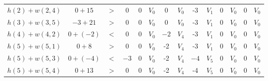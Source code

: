 \documentclass[../tp2_grupo404.tex]{subfiles}
\begin{document}
\begin{table}[H]
\begin{tabular}{@{}cccccccccccccc@{}}
    $h(2)+w(2,4)$ & $0+15$                          & $>$                        & 0                           & 0 & $V_0$ & 0                           & $V_0$                        & -3                          & $V_1$                               & 0 & $V_0$ & 0 & $V_0$ \\
    $h(3)+w(3,5)$ & $-3+21$                         & $>$                        & 0                           & 0 & $V_0$ & 0                           & $V_0$                        & -3                          & $V_1$                               & 0 & $V_0$ & 0 & $V_0$ \\
    $h(4)+w(4,2)$ & {\color[HTML]{9A0000} $0+(-2)$} & {\color[HTML]{9A0000} $<$} & {\color[HTML]{9A0000} $0$}  & 0 & $V_0$ & {\color[HTML]{9A0000} $-2$} & {\color[HTML]{9A0000} $V_4$} & -3                          & $V_1$                               & 0 & $V_0$ & 0 & $V_0$ \\
    $h(5)+w(5,1)$ & $0+8$                           & $>$                        & 0                           & 0 & $V_0$ & -2                          & $V_4$                        & -3                          & $V_1$                               & 0 & $V_0$ & 0 & $V_0$ \\
    $h(5)+w(5,3)$ & {\color[HTML]{9A0000} $0+(-4)$} & {\color[HTML]{9A0000} $<$} & {\color[HTML]{9A0000} $-3$} & 0 & $V_0$ & -2                          & $V_4$                        & {\color[HTML]{9A0000} $-4$} & {\color[HTML]{9A0000} $V_5$}        & 0 & $V_0$ & 0 & $V_0$ \\
    $h(5)+w(5,4)$ & $0+13$                          & $>$                        & 0                           & 0 & $V_0$ & -2                          & $V_4$                        & -4                          & $V_5$                               & 0 & $V_0$ & 0 & $V_0$ \\ \bottomrule
    \end{tabular}
    \label{EjFord1}
\end{table}
\end{document}
